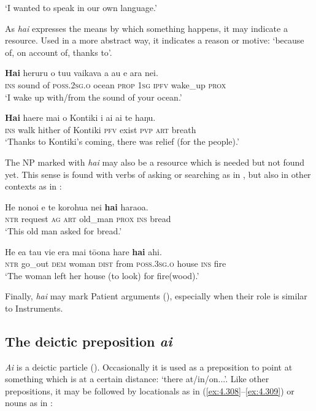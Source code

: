 \glt
‘I wanted to speak in our own language.’ \textstyleExampleref{[R201.002]} 
\z

As \textit{hai} expresses the means by which something happens, it may indicate a resource. Used in a more abstract way, it indicates a reason or motive: ‘because of, on account of, thanks to’.

\ea\label{ex:4.304}
\gll \textbf{Hai} heruru o tu{\ꞌ}u vaikava a au e {\ꞌ}ara nei. \\
\textsc{ins} sound of \textsc{poss.2sg.o} ocean \textsc{prop} \textsc{1sg} \textsc{ipfv} wake\_up \textsc{prox} \\

\glt 
‘I wake up with/from the sound of your ocean.’ \textstyleExampleref{[R474.002]} 
\z

\ea\label{ex:4.305}
\gll \textbf{Hai} ha{\ꞌ}ere mai o Kontiki i ai ai te haŋu. \\
\textsc{ins} walk hither of Kontiki \textsc{pfv} exist \textsc{pvp} \textsc{art} breath \\

\glt
‘Thanks to Kontiki’s coming, there was relief (for the people).’ \textstyleExampleref{[R376.077]} 
\z

The NP marked with \textit{hai} may also be a resource which is needed but not found yet. This sense is found with verbs of asking or searching as in , but also in other contexts as in :

\ea\label{ex:4.306}
\gll He nono{\ꞌ}i e te korohu{\ꞌ}a nei \textbf{hai} haraoa. \\
\textsc{ntr} request \textsc{ag} \textsc{art} old\_man \textsc{prox} \textsc{ins} bread \\

\glt 
‘This old man asked for bread.’ \textstyleExampleref{[R335.019]} 
\z

\ea\label{ex:4.307}
\gll He e{\ꞌ}a tau vi{\ꞌ}e era mai tō{\ꞌ}ona hare \textbf{hai} ahi.  \\
\textsc{ntr} go\_out \textsc{dem} woman \textsc{dist} from \textsc{poss.3sg.o} house \textsc{ins} fire  \\

\glt 
‘The woman left her house (to look) for fire(wood).’ \textstyleExampleref{[Mtx-7-35.013]}
\z

Finally, \textit{hai} may mark Patient arguments (), especially when their role is similar to Instruments.
\subsection{The deictic preposition \textit{{\ꞌ}ai}}\label{sec:4.7.10}
\textit{{\ꞌ}Ai} is a deictic particle (). Occasionally it is used as a preposition to point at something which is at a certain distance: ‘there at/in/on...’. Like other prepositions, it may be followed by locationals as in (\ref{ex:4.308}–\ref{ex:4.309}) or nouns as in :

